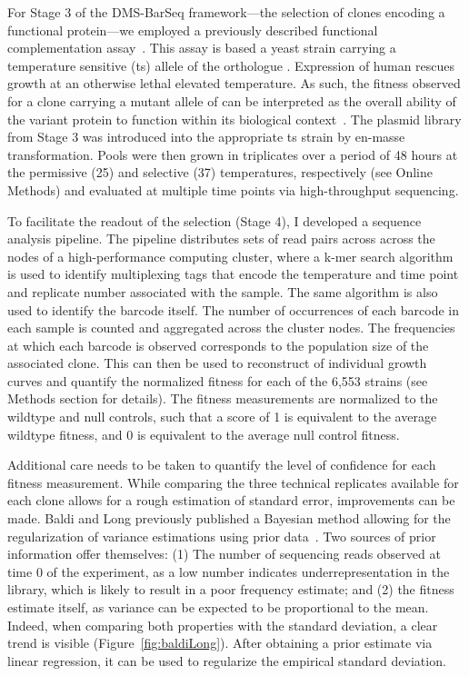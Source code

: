 For Stage 3 of the DMS-BarSeq framework---the selection of clones encoding a functional protein---we employed a previously described  functional complementation assay~\cite{lee_complementation_1987,osborn_rescuing_2007}. This assay is based a yeast strain carrying a temperature sensitive (ts) allele of the  orthologue . Expression of human  rescues growth at an otherwise lethal elevated temperature. As such, the fitness observed for a clone carrying a mutant allele of  can be interpreted as the overall ability of the variant protein to function within its biological context~\cite{sun_extended_2016}. 
The plasmid library from Stage 3 was introduced into the appropriate ts strain by en-masse transformation. Pools were then grown in triplicates over a period of 48 hours at the permissive (25\celsius ) and selective (37\celsius ) temperatures, respectively (see Online Methods) and evaluated at multiple time points via high-throughput sequencing.

To facilitate the readout of the selection (Stage 4), I developed a sequence analysis pipeline. The pipeline distributes sets of read pairs across across the nodes of a high-performance computing cluster, where a k-mer search algorithm is used to identify multiplexing tags that encode the temperature and time point and replicate number associated with the sample. The same algorithm is also used to identify the barcode itself. The number of occurrences of each barcode in each sample is counted and aggregated across the cluster nodes. The frequencies at which each barcode is observed corresponds to the population size of the associated clone. This can then be used to reconstruct of individual growth curves and quantify the normalized fitness for each of the 6,553 strains (see Methods section for details). The fitness measurements are normalized to the wildtype and null controls, such that a score of 1 is equivalent to the average wildtype fitness, and 0 is equivalent to the average null control fitness.

Additional care needs to be taken to quantify the level of confidence for each fitness measurement. While comparing the three technical replicates available for each clone allows for a rough estimation of standard error, improvements can be made. Baldi and Long previously published a Bayesian method allowing for the regularization of variance estimations using prior data~\cite{baldi_bayesian_2001}. Two sources of prior information offer themselves: (1) The number of sequencing reads observed at time 0 of the experiment, as a low number indicates underrepresentation in the library, which is likely to result in a poor frequency estimate; and (2) the fitness estimate itself, as variance can be expected to be proportional to the mean. Indeed, when comparing both properties with the standard deviation, a clear trend is visible (Figure~\ref{fig:baldiLong}). After obtaining a prior estimate via linear regression, it can be used to regularize the empirical standard deviation.

